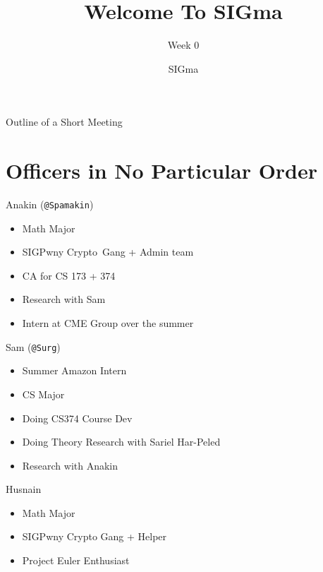 \documentclass[aspectratio=169, handout]{beamer}
\title{Welcome To SIGma}
\subtitle{Week 0}
\author{SIGma}
\date{}
\begin{document}

\begin{frame}
\titlepage
\end{frame}

\begin{frame}{Outline of a Short Meeting}
  \tableofcontents
\end{frame}


\section{Officers in No Particular Order}

\begin{frame}{Anakin (\texttt{@Spamakin})} 
        \begin{itemize}
        \item Math Major
        \item SIGPwny Crypto\footnotemark\ Gang + Admin team
        \item CA for CS 173 + 374
        \item Research with Sam
        \item Intern at CME Group over the summer
    \end{itemize}
\end{frame}

\begin{frame}{Sam (\texttt{@Surg})}
    \begin{itemize}
        \item Summer Amazon Intern
        \item CS Major
        \item Doing CS374 Course Dev
        \item Doing Theory Research with Sariel Har-Peled
        \item Research with Anakin
    \end{itemize}
\end{frame}

\begin{frame}{Husnain}
\begin{itemize}
    \item Math Major
    \item SIGPwny Crypto Gang + Helper
    \item Project Euler Enthusiast
\end{itemize}
\end{frame}
\end{document}

